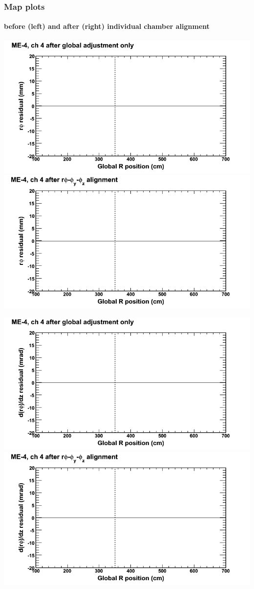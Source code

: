 \documentclass[compress]{beamer}
\begin{document}
\begin{frame}
\frametitle{Map plots}
\framesubtitle{before (left) and after (right) individual chamber alignment}
\includegraphics[width=0.5\linewidth]{ringmapplots_3dof/before_CSCvsr_mem4ch04_x.png} \includegraphics[width=0.5\linewidth]{ringmapplots_3dof/after_CSCvsr_mem4ch04_x.png}

\includegraphics[width=0.5\linewidth]{ringmapplots_3dof/before_CSCvsr_mem4ch04_dxdz.png} \includegraphics[width=0.5\linewidth]{ringmapplots_3dof/after_CSCvsr_mem4ch04_dxdz.png}
\end{frame}
\end{document}
